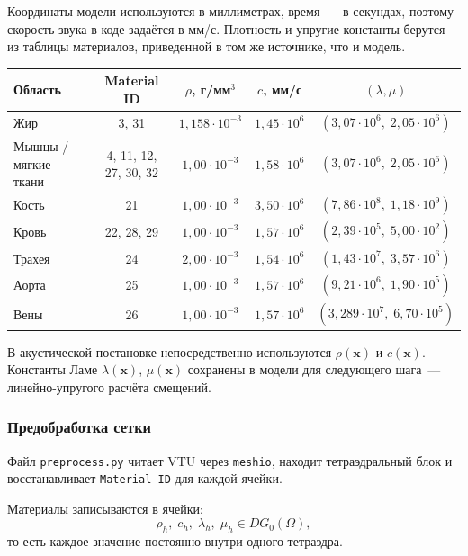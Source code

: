 Координаты модели используются в миллиметрах, время~--- в секундах,
поэтому скорость звука в коде задаётся в мм/с. Плотность и упругие
константы берутся из таблицы материалов, приведенной в том же источнике, что и модель.

\begin{center}
\begin{tabular}{lcccc}
  \hline
  Область & Material ID & $\rho$, г/мм$^3$ & $c$, мм/с
          & $(\lambda, \mu)$ \\
  \hline
  Жир & 3, 31 & $1{,}158\cdot 10^{-3}$ & $1{,}45\cdot 10^6$
      & $(3{,}07\cdot 10^6,\;2{,}05\cdot 10^6)$ \\
  Мышцы / мягкие ткани & 4, 11, 12, 27, 30, 32
      & $1{,}00\cdot 10^{-3}$ & $1{,}58\cdot 10^6$
      & $(3{,}07\cdot 10^6,\;2{,}05\cdot 10^6)$ \\
  Кость & 21 & $1{,}00\cdot 10^{-3}$ & $3{,}50\cdot 10^6$
      & $(7{,}86\cdot 10^8,\;1{,}18\cdot 10^9)$ \\
  Кровь & 22, 28, 29 & $1{,}00\cdot 10^{-3}$ & $1{,}57\cdot 10^6$
      & $(2{,}39\cdot 10^5,\;5{,}00\cdot 10^2)$ \\
  Трахея & 24 & $2{,}00\cdot 10^{-3}$ & $1{,}54\cdot 10^6$
      & $(1{,}43\cdot 10^7,\;3{,}57\cdot 10^6)$ \\
  Аорта & 25 & $1{,}00\cdot 10^{-3}$ & $1{,}57\cdot 10^6$
      & $(9{,}21\cdot 10^6,\;1{,}90\cdot 10^5)$ \\
  Вены & 26 & $1{,}00\cdot 10^{-3}$ & $1{,}57\cdot 10^6$
      & $(3{,}289\cdot 10^7,\;6{,}70\cdot 10^5)$ \\
  \hline
\end{tabular}
\end{center}

В акустической постановке непосредственно используются $\rho(\mathbf{x})$
и $c(\mathbf{x})$. Константы Ламе $\lambda(\mathbf{x})$, $\mu(\mathbf{x})$
сохранены в модели для следующего шага~--- линейно-упругого расчёта
смещений.

\subsubsection{Предобработка сетки}

Файл \texttt{preprocess.py} читает VTU через \texttt{meshio}, находит
тетраэдральный блок и восстанавливает \texttt{Material ID} для каждой
ячейки.

Материалы записываются в ячейки:
\begin{equation}
  \rho_h,\; c_h,\; \lambda_h,\; \mu_h \in DG_0(\Omega),
\end{equation}
то есть каждое значение постоянно внутри одного тетраэдра.

